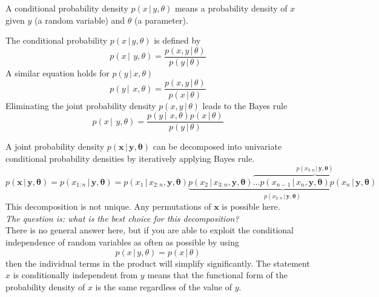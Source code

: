 \documentclass{tstextbook}
\begin{document}
A conditional probability density $p(x\,\vert\, y,\theta)$ means a probability density of $x$ given $y$ (a random variable) and $\theta$ (a parameter).

\begin{definition}
  \label{th:conditionalprobabilitydensity}
  The conditional probability $p(x\,\vert\, y,\theta)$ is defined by
  \begin{equation}
    p(x\,\vert\,\ y,\theta)=\frac{p(x, y\,\vert\, \theta)}{p(y\,\vert\, \theta)}
  \end{equation}
  A similar equation holds for $p(y\,\vert\, x,\theta)$
  \begin{equation}
    p(y\,\vert\,\ x,\theta)=\frac{p(x, y\,\vert\, \theta)}{p(x\,\vert\, \theta)}
  \end{equation}
  Eliminating the joint probability density $p(x, y\,\vert\, \theta)$ leads to the Bayes rule
  \begin{equation}
    p(x\,\vert\,\ y,\theta)=\frac{p(y\,\vert\,\ x,\theta)p(x\,\vert\, \theta)}{p(y\,\vert\, \theta)}
  \end{equation} 
\end{definition}

A joint probability density $p(\mathbf{x}\,\vert\, \mathbf{y},\boldsymbol{\theta})$ can be decomposed into univariate conditional probability densities by iteratively applying Bayes rule.
  \begin{equation}
    p(\mathbf{x}\,\vert\, \mathbf{y},\boldsymbol{\theta})=p(x_{1:n}\,\vert\, \mathbf{y},\boldsymbol{\theta})=p(x_1\,\vert\, x_{2:n},\mathbf{y},\boldsymbol{\theta})
\underbrace{p(x_{2}\,\vert\, x_{3:n},\mathbf{y},\boldsymbol{\theta})\overbrace{\ldots p(x_{n-1}\,\vert\, x_n,\mathbf{y},\boldsymbol{\theta})
p(x_{n}\,\vert\, \mathbf{y},\boldsymbol{\theta})}^{p(x_{3:n}\,\vert\, \mathbf{y},\boldsymbol{\theta})}
}_{p(x_{2:n}\,\vert\, \mathbf{y},\boldsymbol{\theta})}
  \end{equation}
This decomposition is not unique. Any permutations of $\mathbf{x}$ is possible here.\\

\textit{The question is: what is the best choice for this decomposition?}\\

There is no general answer here, but if you are able to exploit the conditional independence of random variables as often as possible by using
  \begin{equation}
    p(x\,\vert\, y,\theta)=p(x\,\vert\, \theta)
  \end{equation}
then the individual terms in the product will simplify significantly.
The statement $x$ is conditionally independent from $y$ means that the functional form of the probability density of $x$ is the same regardless of the value of $y$.\\
\end{document}
